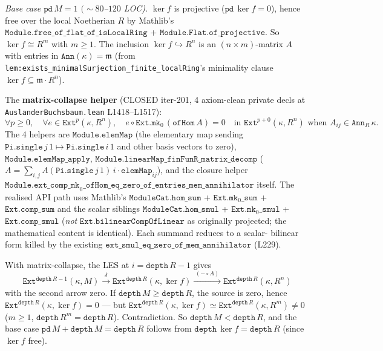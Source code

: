 \textit{Base case \(\texttt{pd}\,M = 1\) \((\sim 80\)--\(120\) LOC).}
\(\ker f\) is projective (\(\texttt{pd}\,\ker f = 0\)), hence free
over the local Noetherian \(R\) by Mathlib's
\(\texttt{Module.free\_of\_flat\_of\_isLocalRing}\) +
\(\texttt{Module.Flat.of\_projective}\). So \(\ker f \cong R^m\) with
\(m \geq 1\). The inclusion \(\ker f \hookrightarrow R^n\) is an
\((n \times m)\)-matrix \(A\) with entries in
\(\texttt{Ann}(\kappa) = \mathfrak m\) (from
\texttt{lem:exists_minimalSurjection_finite_localRing}'s minimality
clause \(\ker f \subseteq \mathfrak m \cdot R^n\)).

The \textbf{matrix-collapse helper}
(CLOSED iter-201, 4 axiom-clean private decls at
\texttt{AuslanderBuchsbaum.lean} L1418--L1517):
\[
  \forall p \geq 0,\quad \forall e \in \texttt{Ext}^p(\kappa, R^n),\quad
  e \circ \texttt{Ext.mk}_0\,(\texttt{ofHom}\,A) = 0
  \quad \text{in } \texttt{Ext}^{p+0}(\kappa, R^n)
  \text{ when } A_{ij} \in \texttt{Ann}_R\,\kappa.
\]
The 4 helpers are \(\texttt{Module.elemMap}\) (the elementary map
sending \(\texttt{Pi.single}\,j\,1 \mapsto \texttt{Pi.single}\,i\,1\)
and other basis vectors to zero), \(\texttt{Module.elemMap\_apply}\),
\(\texttt{Module.linearMap\_finFunR\_matrix\_decomp}\)
(\(A = \sum_{i,j} A(\texttt{Pi.single}\,j\,1)\,i \cdot
   \texttt{elemMap}_{ij}\)), and the closure helper
\(\texttt{Module.ext\_comp\_mk}_0\texttt{\_ofHom\_eq\_zero\_of\_entries\_mem\_annihilator}\)
itself. The realised API path uses Mathlib's
\(\texttt{ModuleCat.hom\_sum}\) + \(\texttt{Ext.mk}_0\texttt{\_sum}\)
+ \(\texttt{Ext.comp\_sum}\) and the scalar siblings
\(\texttt{ModuleCat.hom\_smul}\) + \(\texttt{Ext.mk}_0\texttt{\_smul}\)
+ \(\texttt{Ext.comp\_smul}\) (\emph{not}
\(\texttt{Ext.bilinearCompOfLinear}\) as originally projected; the
mathematical content is identical). Each summand reduces to a scalar-
bilinear form killed by the existing
\(\texttt{ext\_smul\_eq\_zero\_of\_mem\_annihilator}\) (L229).

With matrix-collapse, the LES at \(i = \texttt{depth}\,R - 1\)
gives
\[
  \texttt{Ext}^{\texttt{depth}\,R - 1}(\kappa, M)
  \xrightarrow{\;\delta\;}
  \texttt{Ext}^{\texttt{depth}\,R}(\kappa, \ker f)
  \xrightarrow{\;(- \circ A)\;}
  \texttt{Ext}^{\texttt{depth}\,R}(\kappa, R^n)
\]
with the second arrow zero. If
\(\texttt{depth}\,M \geq \texttt{depth}\,R\), the source is zero,
hence \(\texttt{Ext}^{\texttt{depth}\,R}(\kappa, \ker f) = 0\) ---
but \(\texttt{Ext}^{\texttt{depth}\,R}(\kappa, \ker f) \simeq
\texttt{Ext}^{\texttt{depth}\,R}(\kappa, R^m) \neq 0\)
(\(m \geq 1\), \(\texttt{depth}\,R^m = \texttt{depth}\,R\)).
Contradiction. So \(\texttt{depth}\,M < \texttt{depth}\,R\), and the
base case
\(\texttt{pd}\,M + \texttt{depth}\,M = \texttt{depth}\,R\) follows
from \(\texttt{depth}\,\ker f = \texttt{depth}\,R\) (since \(\ker f\)
free).

